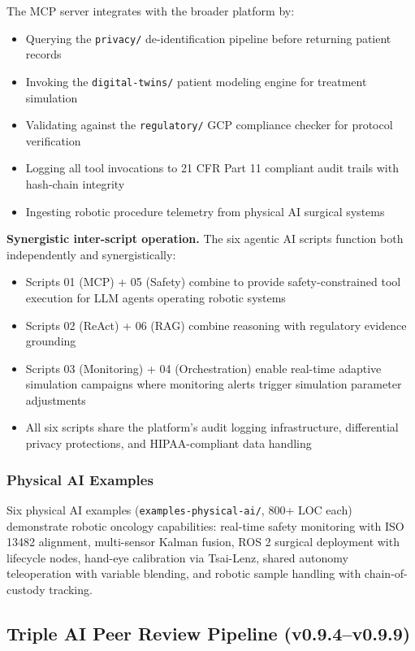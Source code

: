 \documentclass[10pt]{article}
\begin{document}
The MCP server integrates with the broader platform by:
\begin{itemize}
  \item Querying the \texttt{privacy/} de-identification pipeline before returning patient records
  \item Invoking the \texttt{digital-twins/} patient modeling engine for treatment simulation
  \item Validating against the \texttt{regulatory/} GCP compliance checker for protocol verification
  \item Logging all tool invocations to 21 CFR Part 11 compliant audit trails with hash-chain integrity
  \item Ingesting robotic procedure telemetry from physical AI surgical systems
\end{itemize}

\textbf{Synergistic inter-script operation.} The six agentic AI scripts function both independently and synergistically:
\begin{itemize}
  \item Scripts 01 (MCP) + 05 (Safety) combine to provide safety-constrained tool execution for LLM agents operating robotic systems
  \item Scripts 02 (ReAct) + 06 (RAG) combine reasoning with regulatory evidence grounding
  \item Scripts 03 (Monitoring) + 04 (Orchestration) enable real-time adaptive simulation campaigns where monitoring alerts trigger simulation parameter adjustments
  \item All six scripts share the platform's audit logging infrastructure, differential privacy protections, and HIPAA-compliant data handling
\end{itemize}

\subsubsection{Physical AI Examples}

Six physical AI examples (\texttt{examples-physical-ai/}, 800+ LOC each) demonstrate robotic oncology capabilities: real-time safety monitoring with ISO 13482 alignment, multi-sensor Kalman fusion, ROS 2 surgical deployment with lifecycle nodes, hand-eye calibration via Tsai-Lenz, shared autonomy teleoperation with variable blending, and robotic sample handling with chain-of-custody tracking.

\subsection{Triple AI Peer Review Pipeline (v0.9.4--v0.9.9)}
\label{sec:peerreview}
\end{document}
